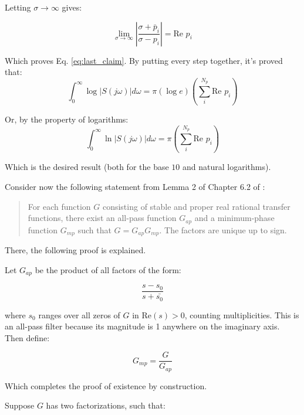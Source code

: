 \documentclass{scrreprt}
\begin{document}
Letting $\sigma\rightarrow\infty$ gives:

\begin{equation}
    \lim_{\sigma\rightarrow\infty}{\left|\frac{\sigma+\bar{p}_i}{\sigma-p_i}\right|}=\text{Re }p_i
\end{equation}

Which proves Eq. \ref{eq:last_claim}. By putting every step together, it's proved that:
\begin{equation}
    \int_{0}^{\infty}\operatorname{log}{|S(j\omega)|d\omega}=\pi(\operatorname{log}{e})\left(\sum_{i}^{N_p}\text{Re }p_i\right)
\end{equation}

Or, by the property of logarithms:
\begin{equation}
    \int_{0}^{\infty}\operatorname{ln}{|S(j\omega)|d\omega}=\pi\left(\sum_{i}^{N_p}\text{Re }p_i\right)
\end{equation}

Which is the desired result (both for the base $10$ and natural logarithms).

Consider now the following statement from Lemma 2 of Chapter 6.2 of \cite{Doy90}:

\begin{quote}
    For each function $G$ consisting of stable and proper real rational transfer functions, there exist
an all-pass function $G_{ap}$ and a minimum-phase function $G_{mp}$ such that $G = G_{ap}G_{mp}$. The
factors are unique up to sign.
\end{quote}

There, the following proof is explained. 

Let $G_{ap}$ be the product of all factors of the form:

\begin{equation}
    \frac{s-s_0}{s+\bar{s_0}}
\end{equation}

where $s_0$ ranges over all zeros of $G$ in $\text{Re}(s)>0$, counting multiplicities. This is an all-pass filter because its magnitude is 1 anywhere on the imaginary axis. Then define:

\begin{equation}
    G_{mp}=\frac{G}{G_{ap}}
\end{equation}

Which completes the proof of existence by construction.
\vspace{0.5cm}

Suppose $G$ has two factorizations, such that:
\end{document}
